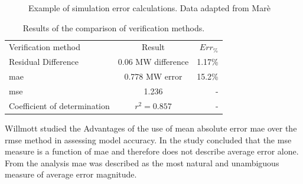  	\begin{figure}[h!]
 		\centering
 		
 		\caption[Example of simulation error calculations.]{Example of simulation error calculations. Data adapted from Marè \cite{Mare2016PhD}}
 		\label{fig:Philipp Difference verify}
 	\end{figure}
 
 \begin{table}[h!]
 	\label{Philip verification table}
 	\centering
 	\begin{tabular}{lcr}
 		\hline
 		Verification method & Result & $Err_{\%}$\\
 		\hhline{===}
 		Residual Difference     & 0.06 MW difference & 1.17\% \\
 		\gls{mae} 					 & 0.778 MW error & 15.2\% \\
 		\gls{mse} 				   & 1.236  & -\\
 		Coefficient of determination & $r^2 =0.857$  & -\\
 		\hline
 	\end{tabular} 
 \caption{Results of the comparison of verification methods.}
 \end{table}
 
 	\par 
 	Willmott \cite{willmott2005advantages} studied the Advantages of the use of mean absolute error \gls{mae} over the \gls{rmse} method in assessing model accuracy. In the study \cite{willmott2005advantages} concluded that the \gls{mse} measure is a function of \gls{mae} and therefore does not describe average error alone. From the analysis \gls{mae} was described as the most natural and unambiguous measure of average error magnitude.

